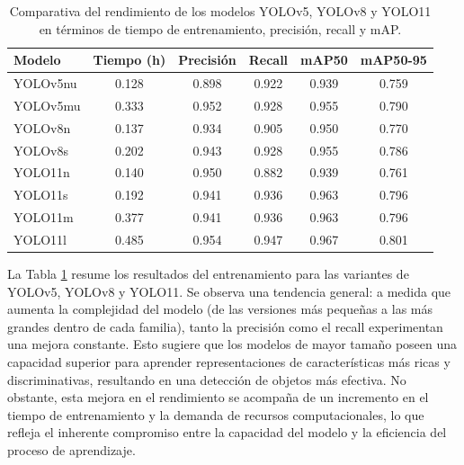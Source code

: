 \documentclass[11pt,spanish,listoffigures,listoftables]{tfgetsinf}
\begin{document}
\begin{table}[H]
   \centering
   \begin{tabular}{l | c | c | c | c | c}
      \toprule
      Modelo & Tiempo (h) & Precisión & Recall & mAP50 & mAP50-95 \\
      \midrule
      YOLOv5nu & 0.128 & 0.898 & 0.922 & 0.939 & 0.759 \\
      YOLOv5mu & 0.333 & 0.952 &  0.928 & 0.955 & 0.790 \\
      YOLOv8n & 0.137 & 0.934 & 0.905 & 0.950 & 0.770 \\
      YOLOv8s & 0.202 & 0.943 & 0.928 & 0.955 & 0.786 \\
      YOLO11n & 0.140 & 0.950 & 0.882 & 0.939 & 0.761 \\
      YOLO11s & 0.192 & 0.941 & 0.936 & 0.963 & 0.796 \\
      YOLO11m & 0.377 & 0.941 & 0.936 & 0.963 & 0.796 \\
      YOLO11l & 0.485 & 0.954 & 0.947 & 0.967 & 0.801 \\
      \bottomrule
   \end{tabular}
   \caption[Comparativa del rendimiento de los modelos YOLOv5, YOLOv8 y YOLO11 en términos de tiempo de entrenamiento, precisión, recall y mAP]{Comparativa del rendimiento de los modelos YOLOv5, YOLOv8 y YOLO11 en términos de tiempo de entrenamiento, precisión, recall y mAP.}
   \label{tab:modelos_metrics}
\end{table}

La Tabla \ref{tab:modelos_metrics} resume los resultados del entrenamiento para las variantes de YOLOv5, YOLOv8 y YOLO11. Se observa una tendencia general: a medida que aumenta la complejidad del modelo (de las versiones más pequeñas a las más grandes dentro de cada familia), tanto la precisión como el recall experimentan una mejora constante. Esto sugiere que los modelos de mayor tamaño poseen una capacidad superior para aprender representaciones de características más ricas y discriminativas, resultando en una detección de objetos más efectiva. No obstante, esta mejora en el rendimiento se acompaña de un incremento en el tiempo de entrenamiento y la demanda de recursos computacionales, lo que refleja el inherente compromiso entre la capacidad del modelo y la eficiencia del proceso de aprendizaje.
\end{document}
